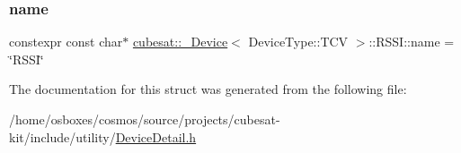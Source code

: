 \subsubsection{\texorpdfstring{name}{name}}
{\footnotesize\ttfamily constexpr const char$\ast$ \hyperlink{structcubesat_1_1__Device}{cubesat\+::\+\_\+\+Device}$<$ Device\+Type\+::\+T\+CV $>$\+::R\+S\+S\+I\+::name = \char`\"{}R\+S\+SI\char`\"{}\hspace{0.3cm}{\ttfamily [static]}}



The documentation for this struct was generated from the following file\+:\begin{DoxyCompactItemize}
\item 
/home/osboxes/cosmos/source/projects/cubesat-\/kit/include/utility/\hyperlink{DeviceDetail_8h}{Device\+Detail.\+h}\end{DoxyCompactItemize}
